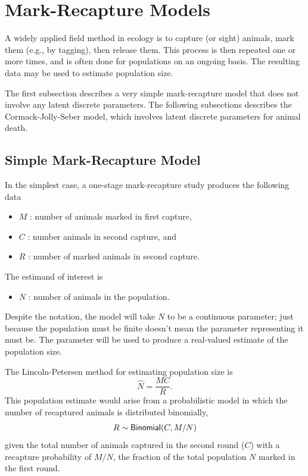\section{Mark-Recapture Models}

A widely applied field method in ecology is to capture (or sight)
animals, mark them (e.g., by tagging), then release them.  This
process is then repeated one or more times, and is often done for
populations on an ongoing basis.  The resulting data may be used to
estimate population size.

The first subsection describes a very simple mark-recapture model that does
not involve any latent discrete parameters.  The following subsections
describes the Cormack-Jolly-Seber model, which involves latent
discrete parameters for animal death.

\subsection{Simple Mark-Recapture Model}

In the simplest case, a one-stage mark-recapture study produces the
following data
%
\begin{itemize}
\item $M$ : number of animals marked in first capture,
\item $C$ : number animals in second capture, and
\item $R$ : number of marked animals in second capture.
\end{itemize}
%
The estimand of interest is
%
\begin{itemize}
\item $N$ : number of animals in the population.
\end{itemize}
%
Despite the notation, the model will take $N$ to be a continuous
parameter; just because the population must be finite doesn't mean the
parameter representing it must be.  The parameter will be used to
produce a real-valued estimate of the population size.

The Lincoln-Petersen \citep{Lincoln:1930,Petersen:1896} method for
estimating population size is
%
\[
\hat{N} = \frac{M C}{R}.
\]
%
This population estimate would arise from a probabilistic model in
which the number of recaptured animals is distributed binomially,
\[
R \sim \distro{Binomial}(C, M / N)
\]
given the total number of animals captured in the second round ($C$)
with a recapture probability of $M/N$, the fraction of the total
population $N$ marked in the first round.

